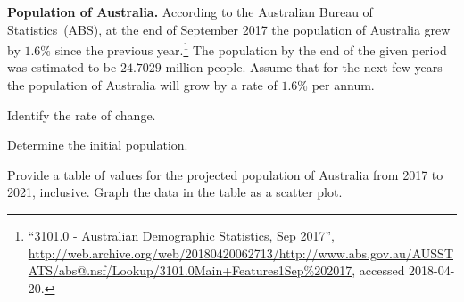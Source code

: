 \documentclass[a4paper,oneside,12pt]{article}
\begin{document}
\begin{example}
\label{eg:exponential:Australian_population_2017}
\textbf{Population of Australia.}
According to the Australian Bureau of Statistics~(ABS), at the end of
September 2017 the population of Australia grew by $1.6\%$ since the
previous year.\footnote{
  ``3101.0 - Australian Demographic Statistics, Sep 2017'',
  \url{http://web.archive.org/web/20180420062713/http://www.abs.gov.au/AUSSTATS/abs@.nsf/Lookup/3101.0Main+Features1Sep\%202017},
  accessed 2018-04-20.
}
The population by the end of the given period was estimated to be
$24.7029$ million people.  Assume that for the next few years the
population of Australia will grow by a rate of $1.6\%$ per annum.
\begin{packedenum}
\item\label{subeg:exponential:Australian_population_2017_growth_rate}
  Identify the rate of change.

\item\label{subeg:exponential:Australian_population_2017_initial_population}
  Determine the initial population.

\item\label{subeg:exponential:Australian_population_2017_table_graph}
  Provide a table of values for the projected population of Australia
  from 2017 to 2021, inclusive.  Graph the data in the table as a
  scatter plot.
\end{packedenum}
\end{example}
\end{document}
